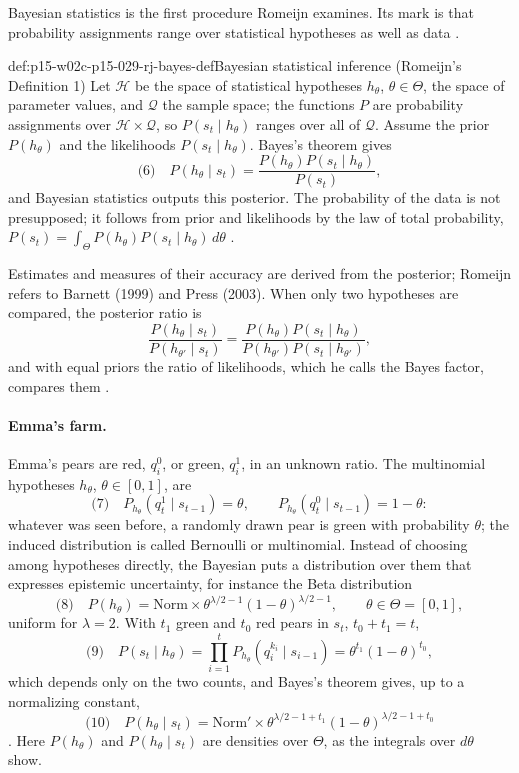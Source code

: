 Bayesian statistics is the first procedure Romeijn examines. Its mark is
that probability assignments range over statistical hypotheses as well
as data \cite[pp.~632--633]{Romeijn2011InductiveLogicStatistics}.

\begin{hbdefinition}{def:p15-w02c-p15-029-rj-bayes-def}{Bayesian statistical inference (Romeijn's Definition 1)}
Let \(\mathcal H\) be the space of statistical hypotheses \(h_\theta\),
\(\theta\in\Theta\), the space of parameter values, and \(\mathcal Q\)
the sample space; the functions \(P\) are probability assignments over
\(\mathcal H\times\mathcal Q\), so \(P(s_t\mid h_\theta)\) ranges over
all of \(\mathcal Q\). Assume the prior \(P(h_\theta)\) and the
likelihoods \(P(s_t\mid h_\theta)\). Bayes's theorem gives
\[
 \text{(6)}\quad P(h_\theta\mid s_t)=\frac{P(h_\theta)P(s_t\mid h_\theta)}{P(s_t)},
\]
and Bayesian statistics outputs this posterior. The probability of the
data is not presupposed; it follows from prior and likelihoods by the
law of total probability,
\(P(s_t)=\int_\Theta P(h_\theta)P(s_t\mid h_\theta)\,d\theta\)
\cite[p.~633]{Romeijn2011InductiveLogicStatistics}.
\end{hbdefinition}

Estimates and measures of their accuracy are derived from the
posterior; Romeijn refers to Barnett (1999) and Press (2003). When only
two hypotheses are compared, the posterior ratio is
\[
 \frac{P(h_\theta\mid s_t)}{P(h_{\theta'}\mid s_t)}
 =\frac{P(h_\theta)P(s_t\mid h_\theta)}{P(h_{\theta'})P(s_t\mid h_{\theta'})},
\]
and with equal priors the ratio of likelihoods, which he calls the
Bayes factor, compares them \cite[p.~633]{Romeijn2011InductiveLogicStatistics}.

\paragraph{Emma's farm.}
Emma's pears are red, \(q^0_i\), or green, \(q^1_i\), in an unknown
ratio. The multinomial hypotheses \(h_\theta\), \(\theta\in[0,1]\), are
\[
 \text{(7)}\quad P_{h_\theta}(q^1_t\mid s_{t-1})=\theta,\qquad
 P_{h_\theta}(q^0_t\mid s_{t-1})=1-\theta:
\]
whatever was seen before, a randomly drawn pear is green with
probability \(\theta\); the induced distribution is called Bernoulli or
multinomial. Instead of choosing among hypotheses directly, the
Bayesian puts a distribution over them that expresses epistemic
uncertainty, for instance the Beta distribution
\[
 \text{(8)}\quad P(h_\theta)=\mathrm{Norm}\times\theta^{\lambda/2-1}(1-\theta)^{\lambda/2-1},
 \qquad\theta\in\Theta=[0,1],
\]
uniform for \(\lambda=2\). With \(t_1\) green and \(t_0\) red pears in
\(s_t\), \(t_0+t_1=t\),
\[
 \text{(9)}\quad P(s_t\mid h_\theta)=\prod_{i=1}^t P_{h_\theta}(q^{k_i}_i\mid s_{i-1})=\theta^{t_1}(1-\theta)^{t_0},
\]
which depends only on the two counts, and Bayes's theorem gives, up to a
normalizing constant,
\[
 \text{(10)}\quad P(h_\theta\mid s_t)=\mathrm{Norm}'\times\theta^{\lambda/2-1+t_1}(1-\theta)^{\lambda/2-1+t_0}
\]
\cite[pp.~633--634]{Romeijn2011InductiveLogicStatistics}. Here
\(P(h_\theta)\) and \(P(h_\theta\mid s_t)\) are densities over
\(\Theta\), as the integrals over \(d\theta\) show.

